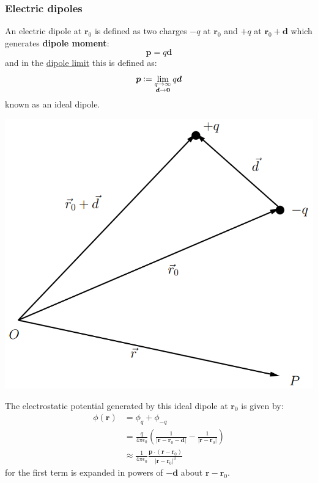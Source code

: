 \documentclass{article}
\newcommand{\deq}{\vcentcolon=}
\newcommand{\vc}[1]{\boldsymbol{#1}}
\begin{document}
\begin{multicols*}{3}
\subsubsection*{Electric dipoles}
An electric dipole at $\vc{r}_0$ is defined as two charges
$-q$ at $\vc{r}_0$ and $+q$ at $\vc{r}_0+\vc{d}$
which generates \textbf{dipole moment}:
$$\vc{p}=q\vc{d}$$
and in the \underline{dipole limit} this is defined as:
$$\vc{p}\deq\lim\limits_{\substack{
    q \to \infty \\
    \vc{d} \to \vc{0}}} q\vc{d}$$
known as an ideal dipole.
\begin{center}
    \includegraphics[scale=0.22]{f2.png}
\end{center}

The electrostatic potential
generated by this ideal dipole at $\vc{r}_0$ is given by:
\begin{align*}
    \phi(\vc{r})
    &=\phi_{q}+\phi_{-q} \\
    &=\frac{q}{4\pi\epsilon_0}\left(
    \frac{1}{|\vc{r}-\vc{r}_0-\vc{d}|}
    -\frac{1}{|\vc{r}-\vc{r}_0|}\right) \\
    &\approx\frac{1}{4\pi\epsilon_0}
    \frac{\vc{p}\cdot(\vc{r}-\vc{r}_0)}{|\vc{r}-\vc{r}_0|^3}
\end{align*}
for the first term is expanded in powers of $-\vc{d}$
about $\vc{r}-\vc{r}_0$. 


\end{multicols*}
\end{document}
